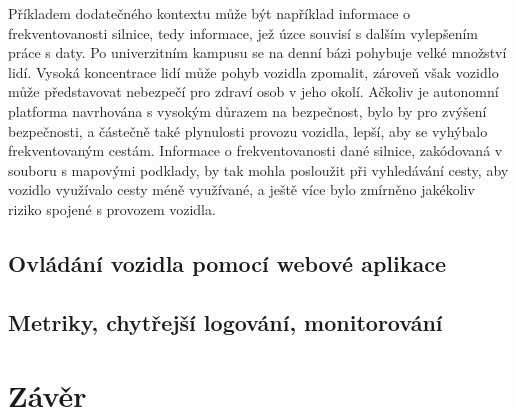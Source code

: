 \documentclass[czech, bachelor]{diploma}
\begin{document}
Příkladem dodatečného kontextu může být například informace o frekventovanosti silnice, tedy informace, jež úzce souvisí s dalším
vylepšením práce s daty. Po univerzitním kampusu se na denní bázi pohybuje velké množství lidí. Vysoká koncentrace lidí může pohyb
vozidla zpomalit, zároveň však vozidlo může představovat nebezpečí pro zdraví osob v jeho okolí. Ačkoliv je autonomní platforma
navrhována s vysokým důrazem na bezpečnost, bylo by pro zvýšení bezpečnosti, a částečně také plynulosti provozu vozidla, lepší,
aby se vyhýbalo frekventovaným cestám. Informace o frekventovanosti dané silnice, zakódovaná v souboru s mapovými podklady, 
by tak mohla posloužit při vyhledávání cesty, aby vozidlo využívalo cesty méně využívané, a ještě více bylo zmírněno jakékoliv
riziko spojené s provozem vozidla.

\section{Ovládání vozidla pomocí webové aplikace} \label{web-app}


\section{Metriky, chytřejší logování, monitorování}


\chapter{Závěr}


\printbibliography[title={Literatura}, heading=bibintoc]

\appendix
% 
% 
\end{document}

